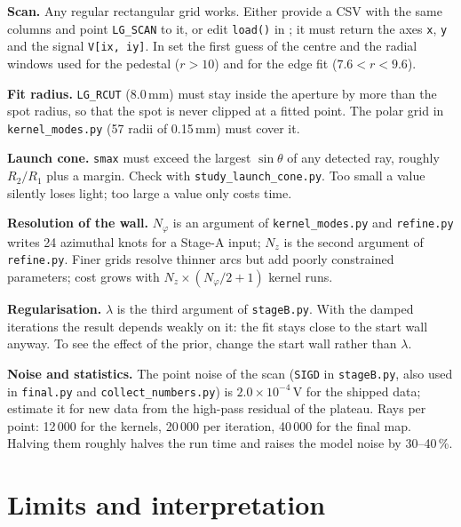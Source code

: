 \documentclass[11pt,a4paper]{article}
\newcommand{\code}[1]{\texttt{#1}}
\begin{document}
\textbf{Scan.} Any regular rectangular grid works. Either provide a CSV with the same columns and
point \code{LG\_SCAN} to it, or edit \code{load()} in ; it must return the axes
\code{x}, \code{y} and the signal \code{V[ix, iy]}. In  set the first guess of the
centre and the radial windows used for the pedestal ($r>10$) and for the edge fit ($7.6<r<9.6$).

\textbf{Fit radius.} \code{LG\_RCUT} (8.0\,mm) must stay inside the aperture by more than the spot
radius, so that the spot is never clipped at a fitted point. The polar grid in
\code{kernel\_modes.py} (57 radii of 0.15\,mm) must cover it.

\textbf{Launch cone.} \code{smax} must exceed the largest $\sin\theta$ of any detected ray, roughly
$R_2/R_1$ plus a margin. Check with \code{study\_launch\_cone.py}. Too small a value silently loses
light; too large a value only costs time.

\textbf{Resolution of the wall.} $N_\varphi$ is an argument of \code{kernel\_modes.py} and
\code{refine.py} writes 24 azimuthal knots for a Stage-A input; $N_z$ is the second argument of
\code{refine.py}. Finer grids resolve thinner arcs but add poorly constrained parameters; cost grows
with $N_z\times(N_\varphi/2+1)$ kernel runs.

\textbf{Regularisation.} $\lambda$ is the third argument of \code{stageB.py}. With the damped
iterations the result depends weakly on it: the fit stays close to the start wall anyway. To see the
effect of the prior, change the start wall rather than $\lambda$.

\textbf{Noise and statistics.} The point noise of the scan (\code{SIGD} in \code{stageB.py}, also
used in \code{final.py} and \code{collect\_numbers.py}) is $2.0\times10^{-4}$\,V for the shipped data;
estimate it for new data from the high-pass residual of the plateau. Rays per point: 12\,000 for the
kernels, 20\,000 per iteration, 40\,000 for the final map. Halving them roughly halves the run time
and raises the model noise by 30--40\,\%.

\section{Limits and interpretation}
\label{sec:limits}
\end{document}
